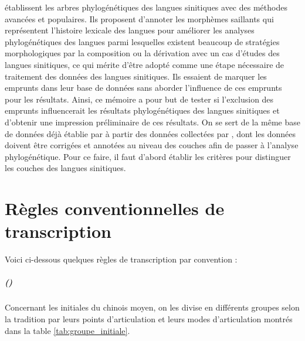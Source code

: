 \documentclass{scrbook}
\newcounter{c}[subsubsection]
\newcommand{\stpc}[1]{\stepcounter{#1}}
\begin{document}
\begin{sloppypar}
\textcite{wu2023annotating} établissent les arbres phylogénétiques des langues sinitiques avec des méthodes avancées et populaires. Ils proposent d'annoter les morphèmes saillants qui représentent l'histoire lexicale des langues pour améliorer les analyses phylogénétiques des langues parmi lesquelles existent beaucoup de stratégies morphologiques par la composition ou la dérivation avec un cas d'études des langues sinitiques, ce qui mérite d'être adopté comme une étape nécessaire de traitement des données des langues sinitiques. Ils essaient de marquer les emprunts dans leur base de données sans aborder l'influence de ces emprunts pour les résultats. Ainsi, ce mémoire a pour but de tester si l'exclusion des emprunts influencerait les résultats phylogénétiques des langues sinitiques et d'obtenir une impression préliminaire de ces résultats. On se sert de la même base de données déjà établie par \textcite{wu2023annotating} à partir des données collectées par \textcite{Liu2007hexinci}, dont les données doivent être corrigées et annotées au niveau des couches afin de passer à l'analyse phylogénétique. Pour ce faire, il faut d'abord établir les critères pour distinguer les couches des langues sinitiques. 

\chapter{Règles conventionnelles de transcription}
Voici ci-dessous quelques règles de transcription par convention : 

\stpc{c}\paragraph{()}
Concernant les initiales du chinois moyen, on les divise en différents groupes selon la tradition par leurs points d'articulation et leurs modes d'articulation montrés dans la table \ref{tab:groupe_initiale}.


\end{sloppypar}
\end{document}
